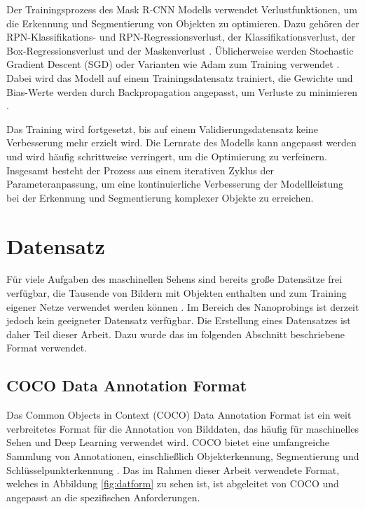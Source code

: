
Der Trainingsprozess des Mask R-CNN Modells verwendet Verlustfunktionen, um die Erkennung und Segmentierung von Objekten zu optimieren. Dazu gehören der RPN-Klassifikations- und RPN-Regressionsverlust, der Klassifikationsverlust, der Box-Regressionsverlust und der Maskenverlust \cite{Girshick_2015_ICCV} \cite{Wang.2022}. Üblicherweise werden Stochastic Gradient Descent (SGD) oder Varianten wie Adam zum Training verwendet \cite{AMARI1993185} \cite{kingma2017adam}. Dabei wird das Modell auf einem Trainingsdatensatz trainiert, die Gewichte und Bias-Werte werden durch Backpropagation angepasst, um Verluste zu minimieren \cite{Rumelhart.1986}.

Das Training wird fortgesetzt, bis auf einem Validierungsdatensatz keine Verbesserung mehr erzielt wird. Die Lernrate des Modells kann angepasst werden und wird häufig schrittweise verringert, um die Optimierung zu verfeinern. Insgesamt besteht der Prozess aus einem iterativen Zyklus der Parameteranpassung, um eine kontinuierliche Verbesserung der Modellleistung bei der Erkennung und Segmentierung komplexer Objekte zu erreichen.
\section{Datensatz}
Für viele Aufgaben des maschinellen Sehens sind bereits große Datensätze frei verfügbar, die Tausende von Bildern mit Objekten enthalten und zum Training eigener Netze verwendet werden können \cite{paperswithcode-datasets} \cite{bioimage-datasets}. Im Bereich des Nanoprobings ist derzeit jedoch kein geeigneter Datensatz verfügbar. Die Erstellung eines Datensatzes ist daher Teil dieser Arbeit. Dazu wurde das im folgenden Abschnitt beschriebene Format verwendet.
\subsection{COCO Data Annotation Format}
Das Common Objects in Context (COCO) Data Annotation Format ist ein weit verbreitetes Format für die Annotation von Bilddaten, das häufig für maschinelles Sehen und Deep Learning verwendet wird. COCO bietet eine umfangreiche Sammlung von Annotationen, einschließlich Objekterkennung, Segmentierung und Schlüsselpunkterkennung \cite{coco}.
Das im Rahmen dieser Arbeit verwendete Format, welches in Abbildung \ref{fig:datform} zu sehen ist, ist abgeleitet von COCO und angepasst an die spezifischen Anforderungen.

